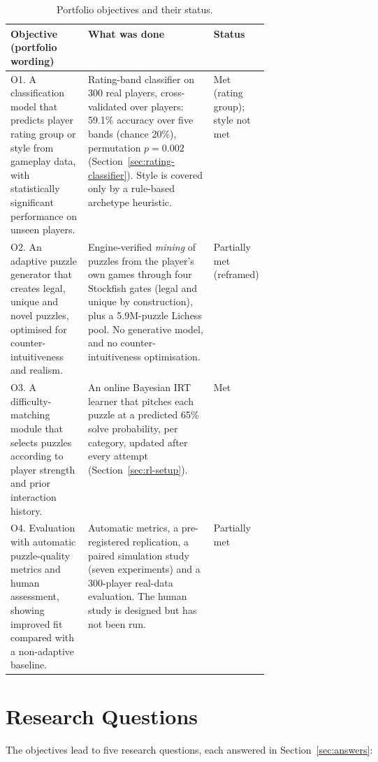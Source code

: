 \begin{table}[H]
\centering
\small
\caption{Portfolio objectives and their status.}\label{tab:objectives}
\begin{tabularx}{\linewidth}{p{0.3\linewidth}Yp{0.13\linewidth}}
\toprule
\textbf{Objective (portfolio wording)} & \textbf{What was done} & \textbf{Status} \\
\midrule
O1. A classification model that predicts player rating group or style from gameplay data, with
statistically significant performance on unseen players. &
Rating-band classifier on 300 real players, cross-validated over players: 59.1\% accuracy over five
bands (chance 20\%), permutation $p=0.002$ (Section~\ref{sec:rating-classifier}). Style is covered
only by a rule-based archetype heuristic. & Met (rating group); style not met \\
O2. An adaptive puzzle generator that creates legal, unique and novel puzzles, optimised for
counter-intuitiveness and realism. &
Engine-verified \emph{mining} of puzzles from the player's own games through four Stockfish gates
(legal and unique by construction), plus a 5.9M-puzzle Lichess pool. No generative model, and no
counter-intuitiveness optimisation. & Partially met (reframed) \\
O3. A difficulty-matching module that selects puzzles according to player strength and prior
interaction history. &
An online Bayesian IRT learner that pitches each puzzle at a predicted 65\% solve probability, per
category, updated after every attempt (Section~\ref{sec:rl-setup}). & Met \\
O4. Evaluation with automatic puzzle-quality metrics and human assessment, showing improved fit
compared with a non-adaptive baseline. &
Automatic metrics, a pre-registered replication, a paired simulation study (seven experiments) and a
300-player real-data evaluation. The human study is designed but has not been run. & Partially met \\
\bottomrule
\end{tabularx}
\end{table}

\section{Research Questions}

The objectives lead to five research questions, each answered in Section~\ref{sec:answers}:

